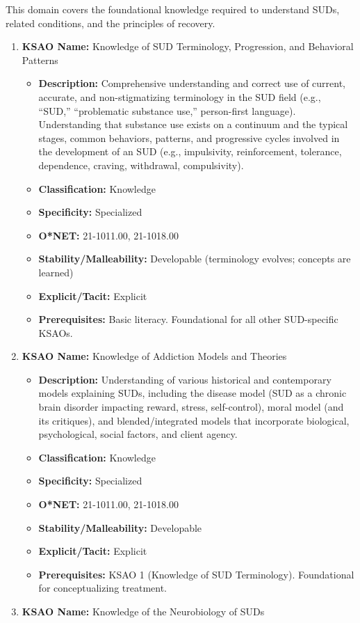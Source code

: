 \documentclass[
  letterpaper,
  DIV=11,
  numbers=noendperiod]{scrartcl}
\providecommand{\tightlist}{%
  \setlength{\itemsep}{0pt}\setlength{\parskip}{0pt}}
\begin{document}
This domain covers the foundational knowledge required to understand
SUDs, related conditions, and the principles of recovery.

\begin{enumerate}
\def\labelenumi{\arabic{enumi}.}
\tightlist
\item
  \textbf{KSAO Name:} Knowledge of SUD Terminology, Progression, and
  Behavioral Patterns

  \begin{itemize}
  \tightlist
  \item
    \textbf{Description:} Comprehensive understanding and correct use of
    current, accurate, and non-stigmatizing terminology in the SUD field
    (e.g., ``SUD,'' ``problematic substance use,'' person-first
    language). Understanding that substance use exists on a continuum
    and the typical stages, common behaviors, patterns, and progressive
    cycles involved in the development of an SUD (e.g., impulsivity,
    reinforcement, tolerance, dependence, craving, withdrawal,
    compulsivity).
  \item
    \textbf{Classification:} Knowledge
  \item
    \textbf{Specificity:} Specialized
  \item
    \textbf{O*NET:} 21-1011.00, 21-1018.00
  \item
    \textbf{Stability/Malleability:} Developable (terminology evolves;
    concepts are learned)
  \item
    \textbf{Explicit/Tacit:} Explicit
  \item
    \textbf{Prerequisites:} Basic literacy. Foundational for all other
    SUD-specific KSAOs.
  \end{itemize}
\item
  \textbf{KSAO Name:} Knowledge of Addiction Models and Theories

  \begin{itemize}
  \tightlist
  \item
    \textbf{Description:} Understanding of various historical and
    contemporary models explaining SUDs, including the disease model
    (SUD as a chronic brain disorder impacting reward, stress,
    self-control), moral model (and its critiques), and
    blended/integrated models that incorporate biological,
    psychological, social factors, and client agency.
  \item
    \textbf{Classification:} Knowledge
  \item
    \textbf{Specificity:} Specialized
  \item
    \textbf{O*NET:} 21-1011.00, 21-1018.00
  \item
    \textbf{Stability/Malleability:} Developable
  \item
    \textbf{Explicit/Tacit:} Explicit
  \item
    \textbf{Prerequisites:} KSAO 1 (Knowledge of SUD Terminology).
    Foundational for conceptualizing treatment.
  \end{itemize}
\item
  \textbf{KSAO Name:} Knowledge of the Neurobiology of SUDs


\end{enumerate}
\end{document}
